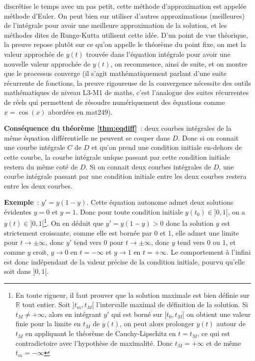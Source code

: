 \documentclass[a4paper,11pt]{article}
\newcommand{\R}{{\mathbb{R}}}
\begin{document}
discr\'etise le temps avec un pas petit, cette m\'ethode
d'approximation est appel\'ee m\'ethode d'Euler. On peut
bien sur utiliser d'autres approximations (meilleures) de
l'int\'egrale pour avoir une meilleure approximation de la solution,
et les m\'ethodes dites de Runge-Kutta utilisent cette id\'ee. D'un
point de vue th\'eorique, la preuve repose plut\^ot sur ce qu'on
appelle le th\'eor\`eme du point fixe, on met la valeur approch\'ee
de $y(t)$ trouv\'ee dans l'\'equation int\'egrale pour avoir
une nouvelle valeur approch\'ee de $y(t)$, on recommence,
ainsi de suite, et on montre que
le processus converge (il s'agit math\'ematiquement parlant
d'une suite r\'ecurrente de fonctions, la preuve rigoureuse
de la convergence n\'ecessite des outils math\'ematiques 
de niveau L3-M1 de maths, c'est l'analogue des suites
r\'ecurrentes de r\'eels qui permettent de r\'esoudre
num\'eriquement des \'equations comme $x=\cos(x)$
abord\'ees en mat249).

{\bf Cons\'equence du th\'eor\`eme \ref{thm:eqdiff}}~: 
deux courbes int\'egrales de la m\^eme \'equation
diff\'erentielle ne peuvent se couper dans $D$. Donc si on connait
une courbe int\'egrale $C$ de $D$ et qu'on prend une condition initiale
en-dehors de cette courbe, la courbe int\'egrale unique passant
par cette condition initiale restera du m\^eme cot\'e de $D$. Si on
connait deux courbes int\'egrales de $D$, une courbe int\'egrale
passant par une condition initiale entre les deux courbes restera
entre les deux courbes.

{\bf Exemple}~: $y'=y(1-y)$. Cette \'equation autonome admet deux solutions
\'evidentes $y=0$ et $y=1$. Donc pour toute condition initiale $y(t_0)
\in ]0,1[$, on a $y(t) \in ]0,1[$\footnote{En toute rigueur,
il faut prouver que la solution maximale est bien d\'efinie sur
$\R$ tout entier. Soit $]t_m,t_M[$ l'intervalle maximal de
d\'efinition de la solution. Si $t_M \neq +\infty$,
alors en int\'egrant $y'$ qui est born\'e sur $[t_0,t_M[$ 
on obtient une valeur finie pour la limite en $t_M$ de $y(t)$,
on peut alors prolonger $y(t)$ autour de $t_M$
en appliquant le th\'eor\`eme de Cauchy-Lipschitz en $t=t_M$,
ce qui est contradictoire avec l'hypoth\`ese de maximalit\'e. 
Donc $t_M=+\infty$ et de m\^eme $t_m=-\infty$}. 
On en d\'eduit que $y'=y(1-y)>0$
donc la solution $y$ est strictement croissante, comme elle est
born\'ee par 0 et 1, elle admet une limite pour $t \rightarrow \pm
\infty$, donc $y'$ tend vers 0 pour $t \rightarrow \pm
\infty$, donc $y$ tend vers 0 ou 1, et comme $y$ croit, 
$y \rightarrow 0$ en $t=-\infty$ et $y \rightarrow 1$ en $t=+\infty$.
Le comportement \`a l'infini est donc ind\'ependant de la valeur
pr\'ecise de la condition initiale, pourvu qu'elle soit dans $]0,1[$.
\end{document}

